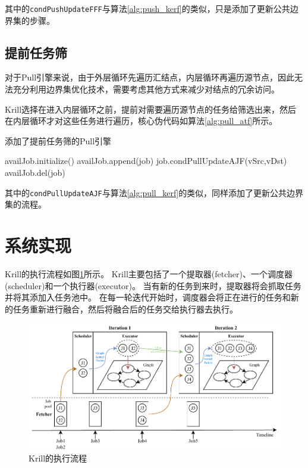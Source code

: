 \documentclass[logo,reportComp]{thesis}
\begin{document}
其中的\verb'condPushUpdateFFF'与算法\ref{alg:push_kerf}的类似，只是添加了更新公共边界集的步骤。

\subsection{提前任务筛}
对于Pull引擎来说，由于外层循环先遍历汇结点，内层循环再遍历源节点，因此无法充分利用边界集优化技术，需要考虑其他方式来减少对结点的冗余访问。

Krill选择在进入内层循环之前，提前对需要遍历源节点的任务给筛选出来，然后在内层循环才对这些任务进行遍历，核心伪代码如算法\ref{alg:pull_atf}所示。
\begin{algorithm}[htbp]
\caption{添加了提前任务筛的Pull引擎}
\label{alg:pull_atf}
\begin{algorithmic}[1]
\State availJob.initialize()
\State availJob.append(job)
\EndIf
\EndFor
{}
\State job.condPullUpdateAJF(vSrc,vDst)
\State availJob.del(job)
\EndIf
\EndFor
\EndFor
\EndFor
\end{algorithmic}
\end{algorithm}

其中的\verb'condPullUpdateAJF'与算法\ref{alg:pull_kerf}的类似，同样添加了更新公共边界集的流程。

\section{系统实现}
Krill的执行流程如图\ref{fig:overview}所示。
Krill主要包括了一个提取器(fetcher)、一个调度器(scheduler)和一个执行器(executor)。
当有新的任务到来时，提取器将会抓取任务并将其添加入任务池中。
在每一轮迭代开始时，调度器会将正在进行的任务和新的任务重新进行融合，然后将融合后的任务交给执行器去执行。
\begin{figure}[H]
\centering
\includegraphics[width=0.8\linewidth]{fig/krill-interactive.pdf}
\caption{Krill的执行流程}
\label{fig:overview}
\end{figure}
\end{document}
